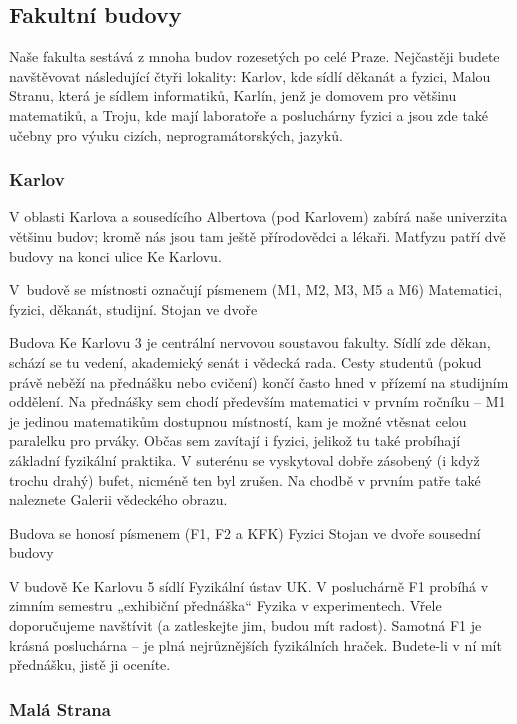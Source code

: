 \subsection{Fakultní budovy}
Naše fakulta sestává z mnoha budov rozesetých po celé Praze. Nejčastěji budete
navštěvovat následující čtyři lokality: Karlov, kde sídlí děkanát a fyzici,
Malou Stranu, která je sídlem informatiků, Karlín, jenž je domovem pro většinu
matematiků, a Troju, kde mají laboratoře a posluchárny fyzici a jsou zde také
učebny pro výuku cizích, neprogramátorských, jazyků.


\subsubsection{Karlov}
V oblasti Karlova a sousedícího Albertova (pod Karlovem) zabírá naše univerzita
většinu budov; kromě nás jsou tam ještě přírodovědci a lékaři. Matfyzu patří dvě
budovy na konci ulice Ke Karlovu.


{V~budově se místnosti označují písmenem  (M1, M2, M3, M5 a M6)}
{Matematici, fyzici, děkanát, studijní.}
{Stojan ve dvoře}

\noindent Budova Ke Karlovu 3 je centrální nervovou soustavou fakulty. Sídlí zde
děkan, schází se tu vedení, akademický senát i vědecká rada. Cesty studentů
(pokud právě neběží na přednášku nebo cvičení) končí často hned v přízemí na
studijním oddělení. Na přednášky sem chodí především matematici v prvním ročníku
– M1 je jedinou matematikům dostupnou místností, kam je možné vtěsnat celou
paralelku pro prváky. Občas sem zavítají i fyzici, jelikož tu také probíhají
základní fyzikální praktika. V suterénu se vyskytoval dobře zásobený (i když
trochu drahý) bufet, nicméně ten byl zrušen. Na chodbě v prvním patře také
naleznete Galerii vědeckého obrazu.


{Budova se honosí písmenem  (F1, F2 a KFK)}
{Fyzici}
{Stojan ve dvoře sousední budovy}

\noindent V budově Ke Karlovu 5 sídlí Fyzikální ústav UK. V posluchárně F1
probíhá v zimním semestru „exhibiční přednáška“ Fyzika v experimentech. Vřele
doporučujeme navštívit (a zatleskejte jim, budou mít radost). Samotná F1 je
krásná posluchárna – je plná nejrůznějších fyzikálních hraček. Budete-li v ní
mít přednášku, jistě ji oceníte.


\subsubsection{Malá Strana}


